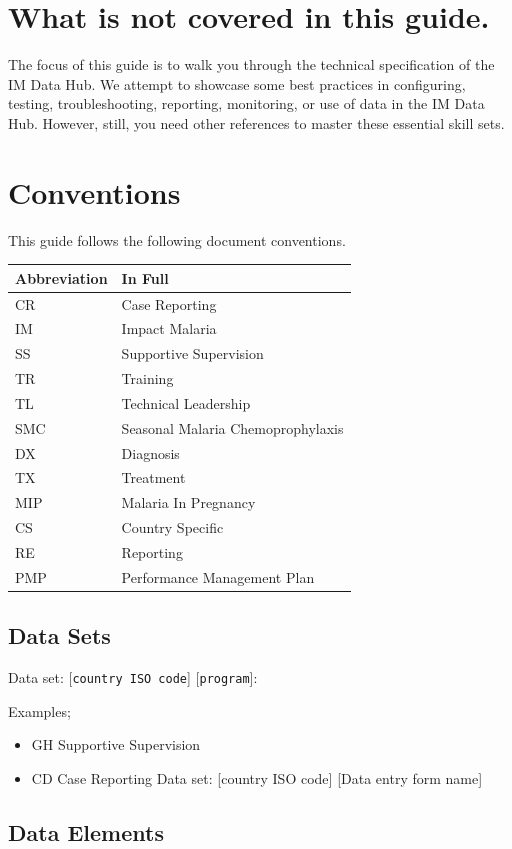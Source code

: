 \documentclass[]{book}
\providecommand{\tightlist}{%
  \setlength{\itemsep}{0pt}\setlength{\parskip}{0pt}}
\begin{document}
\hypertarget{what-is-not-covered-in-this-guide.}{%
\section{What is not covered in this guide.}\label{what-is-not-covered-in-this-guide.}}

The focus of this guide is to walk you through the technical specification of the IM Data Hub. We attempt to showcase some best practices in configuring, testing, troubleshooting, reporting, monitoring, or use of data in the IM Data Hub. However, still, you need other references to master these essential skill sets.

\hypertarget{conventions}{%
\section{Conventions}\label{conventions}}

This guide follows the following document conventions.

\begin{longtable}[]{@{}ll@{}}
\toprule
Abbreviation & In Full\tabularnewline
\midrule
\endhead
CR & Case Reporting\tabularnewline
IM & Impact Malaria\tabularnewline
SS & Supportive Supervision\tabularnewline
TR & Training\tabularnewline
TL & Technical Leadership\tabularnewline
SMC & Seasonal Malaria Chemoprophylaxis\tabularnewline
DX & Diagnosis\tabularnewline
TX & Treatment\tabularnewline
MIP & Malaria In Pregnancy\tabularnewline
CS & Country Specific\tabularnewline
RE & Reporting\tabularnewline
PMP & Performance Management Plan\tabularnewline
\bottomrule
\end{longtable}

\hypertarget{data-sets}{%
\subsection{Data Sets}\label{data-sets}}

Data set: {[}\texttt{country\ ISO\ code}{]} {[}\texttt{program}{]}:

Examples;

\begin{itemize}
\tightlist
\item
  GH Supportive Supervision
\item
  CD Case Reporting \textbar{}Data set: {[}country ISO code{]} {[}Data entry form name{]}
\end{itemize}

\hypertarget{data-elements}{%
\subsection{Data Elements}\label{data-elements}}
\end{document}
